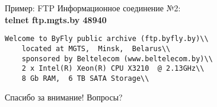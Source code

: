 \begin{frame}{Пример: FTP}
Информационное соединение №2:\\
\medskip
\scriptsize
{\bfseries telnet ftp.mgts.by 48940}\\
\begin{verbatim}
Welcome to ByFly public archive (ftp.byfly.by)\\
	located at MGTS,  Minsk,  Belarus\\
	sponsored by Beltelecom (www.beltelecom.by)\\
	2 x Intel(R) Xeon(R) CPU X3210  @ 2.13GHz\\
	8 Gb RAM,  6 TB SATA Storage\\
\end{verbatim}
\normalsize
\end{frame}

\begin{frame}{}
\Huge
\begin{center}
	Спасибо за внимание!
	\bigskip
	Вопросы?
\end{center}
\normalsize
\end{frame}




